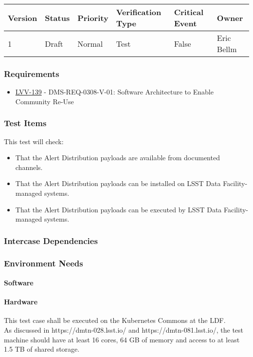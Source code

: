 \begin{longtable}[]{llllll}
\toprule
Version & Status & Priority & Verification Type & Critical Event & Owner
\\\midrule
1 & Draft & Normal &
Test & False & Eric Bellm
\\\bottomrule
\end{longtable}

\subsubsection{Requirements}
\begin{itemize}
\item \href{https://jira.lsstcorp.org/browse/LVV-139}{LVV-139} - DMS-REQ-0308-V-01: Software Architecture to Enable Community Re-Use
\end{itemize}

\subsubsection{Test Items}
This test will check:\\

\begin{itemize}
\tightlist
\item
  That the Alert Distribution payloads are available from documented
  channels.
\item
  That the Alert Distribution payloads can be installed on LSST Data
  Facility-managed systems.
\item
  That the Alert Distribution payloads can be executed by LSST Data
  Facility-managed systems.
\end{itemize}



\subsubsection{Intercase Dependencies}

\subsubsection{Environment Needs}

\paragraph{Software}

\paragraph{Hardware}
This test case shall be executed on the Kubernetes Commons at the LDF.\\
As discussed in https://dmtn-028.lsst.io/ and https://dmtn-081.lsst.io/,
the test machine should have at least 16 cores, 64 GB of memory and
access to at least 1.5 TB of shared storage.


